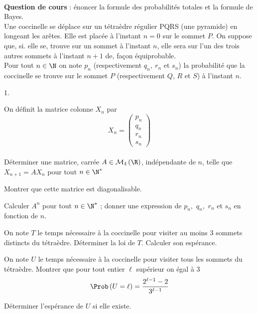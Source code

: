 \documentclass[11pt]{article}%
\begin{document}


\begin{exerciceAP}~\\
  \textbf{Question de cours} : énoncer la formule des probabilités
  totales et la formule de Bayes.\\[.2cm]
  Une coccinelle se déplace sur un tétraèdre régulier PQRS (une
  pyramide) en longeant les arêtes. Elle est placée à l'instant $n=0$
  sur le sommet $P$. On suppose que, si. elle se, trouve sur un sommet
  à l'instant $n$, elle sera sur l'un des trois autres sommets à
  l'instant $n+1$ de, fa\c{c}on équiprobable.
  \\
  Pour tout $n\in \N$ on note $p_{n}$ (respectivement $q_{n},\ r_{n}$
  et $s_{n}$) la probabilité que la coccinelle se trouve sur le sommet
  $P$ (respectivement $Q$, $R$ et $S$) à l'instant $n$.

  \begin{noliste}{1.}
    \setlength{\itemsep}{2mm}
  \item On définit la matrice colonne $X_{n}$ par 
    \begin{equation*}
      X_{n}=\left( 
        \begin{array}{c}
          p_{n} \\ 
          q_{n} \\ 
          r_{n} \\ 
          s_{n}%
        \end{array}%
      \right) 
    \end{equation*}%
    \\
    Déterminer une matrice, carrée $A\in \mathcal{M}_{4}\left( \R%
    \right) $, indépendante de $n$, telle que $X_{n+1}=AX_{n}$ pour
    tout $n\in \N^{\ast }$

  \item Montrer que cette matrice est diagonalisable.

  \item Calculer $A^{n}$ pour tout $n\in \N^{\ast }$ ; donner une
    expression de $p_{n},$ $q_{n},$ $r_{n}$ et $s_{n}$ en fonction de $n$.

  \item On note $T$ le temps nécessaire à la coccinelle pour visiter
    au moins 3 sommets distincts du tétraèdre. Déterminer la loi de $%
    T$. Calculer son espérance.

  \item On note $U$ le temps nécessaire à la coccinelle pour visiter
    tous les sommets du tétraèdre. Montrer que pour tout entier $\ell $
    supérieur on égal à 3%
    \begin{equation*}
      \Prob\left( U=\ell \right) =\frac{2^{\ell -1}-2}{3^{\ell -1}}
    \end{equation*}

  \item Déterminer l'espérance de $U$ si elle existe.
  \end{noliste}  
\end{exerciceAP}
\end{document}

